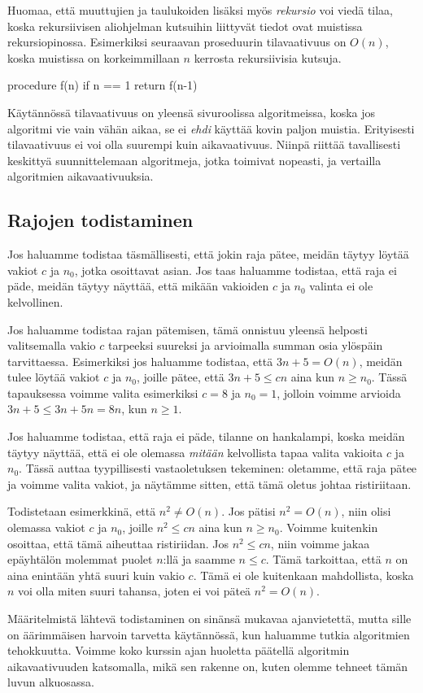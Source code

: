 Huomaa, että muuttujien ja taulukoiden lisäksi myös \emph{rekursio}
voi viedä tilaa, koska rekursiivisen aliohjelman kutsuihin liittyvät
tiedot ovat muistissa rekursiopinossa.
Esimerkiksi seuraavan proseduurin tilavaativuus on $O(n)$,
koska muistissa on korkeimmillaan $n$ kerrosta rekursiivisia kutsuja.

\begin{code}
    procedure f(n)
    if n == 1
    return
    f(n-1)
\end{code}



Käytännössä tilavaativuus on yleensä sivuroolissa algoritmeissa,
koska jos algoritmi vie vain vähän aikaa, se ei \emph{ehdi} käyttää kovin paljon muistia.
Erityisesti tilavaativuus ei voi olla suurempi kuin aikavaativuus.
Niinpä riittää tavallisesti keskittyä suunnittelemaan algoritmeja,
jotka toimivat nopeasti, ja vertailla algoritmien aikavaativuuksia.

\subsection{Rajojen todistaminen}

Jos haluamme todistaa täsmällisesti, että jokin raja pätee,
meidän täytyy löytää vakiot $c$ ja $n_0$, jotka osoittavat asian.
Jos taas haluamme todistaa, että raja ei päde,
meidän täytyy näyttää, että mikään vakioiden $c$ ja $n_0$ valinta ei ole kelvollinen.

Jos haluamme todistaa rajan pätemisen,
tämä onnistuu yleensä helposti valitsemalla vakio $c$
tarpeeksi suureksi ja arvioimalla summan osia ylöspäin tarvittaessa.
Esimerkiksi jos haluamme todistaa, että $3n+5 = O(n)$, meidän tulee löytää
vakiot $c$ ja $n_0$, joille pätee, että $3n+5 \le cn$ aina kun $n \ge n_0$.
Tässä tapauksessa voimme valita esimerkiksi $c=8$ ja $n_0=1$,
jolloin voimme arvioida $3n+5 \le 3n+5n=8n$, kun $n \ge 1$.

Jos haluamme todistaa, että raja ei päde, tilanne on hankalampi,
koska meidän täytyy näyttää, että ei ole olemassa \emph{mitään} kelvollista
tapaa valita vakioita $c$ ja $n_0$.
Tässä auttaa tyypillisesti vastaoletuksen tekeminen: oletamme,
että raja pätee ja voimme valita vakiot,
ja näytämme sitten, että tämä oletus johtaa ristiriitaan.

Todistetaan esimerkkinä, että $n^2 \neq O(n)$.
Jos pätisi $n^2=O(n)$, niin olisi olemassa vakiot $c$ ja $n_0$,
joille $n^2 \le cn$ aina kun $n \ge n_0$.
Voimme kuitenkin osoittaa, että tämä aiheuttaa ristiriidan.
Jos $n^2 \le cn$, niin voimme jakaa epäyhtälön molemmat puolet $n$:llä
ja saamme $n \le c$.
Tämä tarkoittaa, että $n$ on aina enintään yhtä suuri kuin vakio $c$.
Tämä ei ole kuitenkaan mahdollista, koska $n$ voi olla miten
suuri tahansa, joten ei voi päteä $n^2 = O(n)$.

Määritelmistä lähtevä todistaminen on sinänsä mukavaa ajanvietettä,
mutta sille on äärimmäisen harvoin tarvetta käytännössä,
kun haluamme tutkia algoritmien tehokkuutta.
Voimme koko kurssin ajan huoletta päätellä algoritmin aikavaativuuden
katsomalla, mikä sen rakenne on, kuten olemme tehneet tämän luvun alkuosassa.
